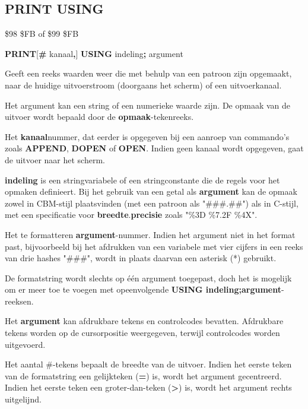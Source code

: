 \subsection{PRINT USING}
\begin{description}[leftmargin=2cm,style=nextline]
\item [Token:]    \$98 \$FB of \$99 \$FB

\item [Formaat:]   {\bf PRINT}[{\bf\#} kanaal{\bf,}] {\bf USING} indeling{\bf;} argument

\item [Gebruik:]    Geeft een reeks waarden weer die met behulp van een patroon zijn opgemaakt, naar de huidige uitvoerstroom (doorgaans het scherm) of een uitvoerkanaal.

                  Het argument kan een string of een numerieke waarde zijn. De opmaak van de uitvoer wordt bepaald door de {\bf opmaak}-tekenreeks.

                  Het {\bf kanaal}nummer, dat eerder is opgegeven bij een aanroep van commando's zoals {\bf APPEND}, {\bf DOPEN} of {\bf OPEN}. Indien geen kanaal wordt opgegeven, gaat de uitvoer naar het scherm.

                  {\bf indeling} is een stringvariabele of een stringconstante die de regels voor het opmaken definieert. Bij het gebruik van een getal als {\bf argument} kan de opmaak zowel in CBM-stijl plaatsvinden (met een patroon als "\#\#\#.\#\#") als in C-stijl, met een specificatie voor {\bf breedte}.{\bf precisie} zoals "\%3D \%7.2F \%4X".

                  Het te formatteren {\bf argument}-nummer. Indien het argument niet in het format past, bijvoorbeeld bij het afdrukken van een variabele met vier cijfers in een reeks van drie hashes "\#\#\#", wordt in plaats daarvan een asterisk (*) gebruikt.

\item [Opmerkingen:]  De formatstring wordt slechts op één argument toegepast, doch het is mogelijk om er meer toe te voegen met opeenvolgende {\bf USING indeling;argument}-reeksen.

                  Het {\bf argument} kan afdrukbare tekens en controlcodes bevatten. Afdrukbare tekens worden op de cursorpositie weergegeven, terwijl controlcodes worden uitgevoerd.

                  Het aantal \#-tekens bepaalt de breedte van de uitvoer. Indien het eerste teken van de formatstring een gelijkteken ({\bf =}) is, wordt het argument gecentreerd. Indien het eerste teken een groter-dan-teken ({\bf >}) is, wordt het argument rechts uitgelijnd.


\end{description}
